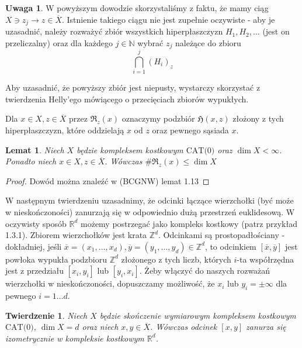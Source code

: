 \documentclass[licencjacka]{pracamgr}
\theoremstyle{definition}
\theoremstyle{definition}
\newtheorem{remark}{Uwaga}[section]
\theoremstyle{definition}
\theoremstyle{definition}
\theoremstyle{definition}
\theoremstyle{plain}
\newtheorem{lemma}{Lemat}[section]
\theoremstyle{plain}
\newtheorem{theorem}{Twierdzenie}[section]
\begin{document}
\begin{remark}
	W powyższym dowodzie skorzystaliśmy z faktu, że mamy ciąg $X \ni z_j \rightarrow z \in 
	\overline{X}$. 
	Istnienie takiego ciągu nie jest zupełnie oczywiste - aby je uzasadnić, należy 
	rozważyć zbiór wszystkich hiperpłaszczyzn $ H_1, H_2, \dots $ (jest on przeliczalny) 
	oraz dla każdego $ j \in \mathbb{N}$ wybrać $ z_j $ należące do zbioru
	$$ \bigcap\limits_{i=1}^j (H_i)_z $$
	
	Aby uzasadnić, że powyższy zbiór jest niepusty, wystarczy skorzystać z twierdzenia 
	Helly'ego mówiącego o przecięciach zbiorów wypukłych. %
\end{remark}
Dla $ x \in X, z \in \overline{X} $ przez $ \mathfrak{R}_z(x) $ oznaczymy 
podzbiór $ \mathfrak{H}(x,z) $ złożony z tych hiperpłaszczyzn, które oddzielają 
$x $ od $ z $ oraz pewnego sąsiada $ x $. 
\begin{lemma}
	Niech $ X $ będzie kompleksem kostkowym $ \text{CAT(0)} $ oraz $ \dim{X} < \infty $. 
	Ponadto niech $ x \in X, z \in \overline{X} $.
	Wówczas $ \# \mathfrak{R}_z(x) \leq \dim{X}$
\end{lemma}
\begin{proof}
	Dowód można znaleźć w (BCGNW)
	 lemat 1.13
\end{proof}

W następnym twierdzeniu uzasadnimy, że odcinki łączące wierzchołki (być może 
w nieskończoności) zanurzają się w odpowiednio dużą przestrzeń euklidesową. W oczywisty 
sposób $ \mathbb{R}^d $ możemy postrzegać jako kompleks kostkowy (patrz przykład 1.3.1). 
Zbiorem wierzchołków jest krata $ \mathbb{Z}^d $. Odcinkami są prostopadłościany - 
dokładniej, jeśli 
$ \overline{x} = (x_1, \dots, x_d), \overline{y} = (y_1, \dots, y_d)  \in\mathbb{Z}^d $, 
to odcinkiem $ [\overline{x}, \overline{y}] $ jest powłoka wypukła podzbioru $ \mathbb{Z}^d$ 
złożonego z tych liczb, których $ i $-ta współrzędna jest z przedziału $ [x_i, y_i] $ lub
$ [y_i, x_i] $.
Żeby włączyć do naszych rozważań wierzchołki w nieskończoności, dopuszczamy możliwość, że 
$ x_i  $ lub $ y_i = \pm \infty $ dla pewnego $ i = 1 \dots d$.

\begin{theorem} \label{thm:zanurzanie}
	Niech $ X $ będzie skończenie wymiarowym kompleksem kostkowym $ \text{CAT(0)} $, 
	$ \dim{X} = d $ oraz niech $ x,y \in \overline{X} $. Wówczas odcinek $ [x,y] $ zanurza 
	się izometrycznie w kompleksie kostkowym $ \mathbb{R}^d $.
\end{theorem}
\end{document}
